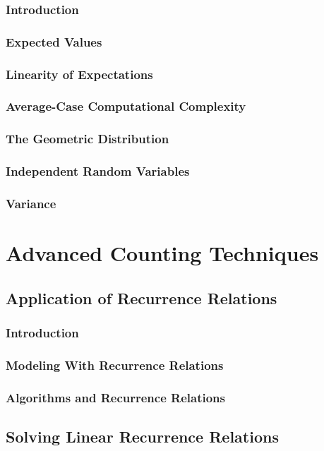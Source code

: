 \documentclass[11pt]{book}
\begin{document}
  \subsection{Introduction}
  \subsection{Expected Values}
  \subsection{Linearity of Expectations}
  \subsection{Average-Case Computational Complexity}
  \subsection{The Geometric Distribution}
  \subsection{Independent Random Variables}
  \subsection{Variance}
 
\chapter{Advanced Counting Techniques}
 \section{Application of Recurrence Relations}
  \subsection{Introduction}
  \subsection{Modeling With Recurrence Relations}
  \subsection{Algorithms and Recurrence Relations}
  
 \section{Solving Linear Recurrence Relations}
\end{document}
